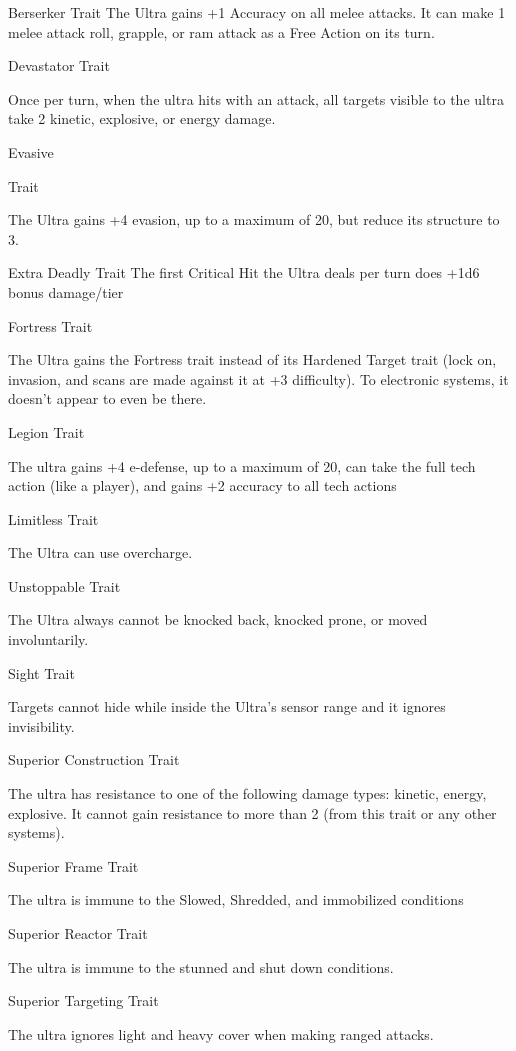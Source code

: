 Berserker
Trait
The Ultra gains +1 Accuracy on all melee attacks. It can make 1 melee attack roll, grapple, or
ram attack as a Free Action on its turn.


Devastator
Trait

Once per turn, when the ultra hits with an attack, all targets visible to the ultra take 2 kinetic,
explosive, or energy damage.


Evasive

Trait

The Ultra gains +4 evasion, up to a maximum of 20, but reduce its structure to 3.


Extra Deadly
Trait
The first Critical Hit the Ultra deals per turn does +1d6 bonus damage/tier


Fortress
Trait

The Ultra gains the Fortress trait instead of its Hardened Target trait (lock on, invasion, and scans
are made against it at +3 difficulty). To electronic systems, it doesn’t appear to even be there.


Legion
Trait

The ultra gains +4 e-defense, up to a maximum of 20, can take the full tech action (like a player),
and gains +2 accuracy to all tech actions


Limitless
Trait

The Ultra can use overcharge.


Unstoppable
Trait

The Ultra always cannot be knocked back, knocked prone, or moved involuntarily.


Sight
Trait

Targets cannot hide while inside the Ultra’s sensor range and it ignores invisibility.


Superior Construction
Trait

The ultra has resistance to one of the following damage types: kinetic, energy, explosive. It
cannot gain resistance to more than 2 (from this trait or any other systems).





Superior Frame
Trait

The ultra is immune to the Slowed, Shredded, and immobilized conditions


Superior Reactor
Trait

The ultra is immune to the stunned and shut down conditions.


Superior Targeting
Trait

The ultra ignores light and heavy cover when making ranged attacks.


